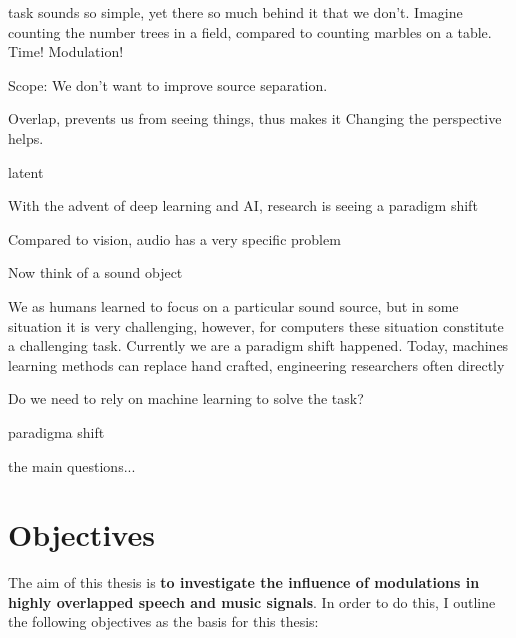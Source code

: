 task sounds so simple, yet there so much behind it that we don't. Imagine counting the number trees in a field, compared to counting marbles on a table. Time! Modulation!

Scope: We don't want to improve source separation.

Overlap, prevents us from seeing things, thus makes it
Changing the perspective helps.

latent


With the advent of deep learning and AI, research is seeing a paradigm shift 

Compared to vision, audio has a very specific problem 

Now think of a sound object 


We as humans learned to focus on a particular sound source, but in some situation it is very challenging, however, for computers these situation constitute a challenging task.
Currently we are  a paradigm shift happened. 
Today, machines learning methods can replace hand crafted, engineering researchers often directly 

Do we need to rely on machine learning to solve the task?

paradigma shift

the main questions...



 

\section{Objectives}

The aim of this thesis is \textbf{to investigate the influence of modulations in highly overlapped speech and music signals}.
In order to do this, I outline the following objectives as the basis for this thesis:


